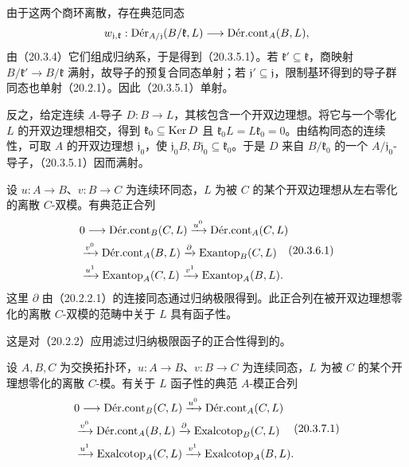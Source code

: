 由于这两个商环离散，存在典范同态
\[
 w_{\mathfrak j,\mathfrak k}:\Der_{A/\mathfrak j}(B/\mathfrak k,L)
 \longrightarrow\DerCont_A(B,L),
\]
由（20.3.4）它们组成归纳系，于是得到（20.3.5.1）。若 $\mathfrak k'\subseteq\mathfrak k$，商映射 $B/\mathfrak k'\to B/\mathfrak k$ 满射，故导子的预复合同态单射；若 $\mathfrak j'\subseteq\mathfrak j$，限制基环得到的导子群同态也单射（20.2.1）。因此（20.3.5.1）单射。

反之，给定连续 $A$-导子 $D:B\to L$，其核包含一个开双边理想。将它与一个零化 $L$ 的开双边理想相交，得到 $\mathfrak k_0\subseteq\Ker D$ 且 $\mathfrak k_0L=L\mathfrak k_0=0$。由结构同态的连续性，可取 $A$ 的开双边理想 $\mathfrak j_0$，使 $\mathfrak j_0B,B\mathfrak j_0\subseteq\mathfrak k_0$。于是 $D$ 来自 $B/\mathfrak k_0$ 的一个 $A/\mathfrak j_0$-导子，（20.3.5.1）因而满射。

设 $u:A\to B$、$v:B\to C$ 为连续环同态，$L$ 为被 $C$ 的某个开双边理想从左右零化的离散 $C$-双模。有典范正合列
\begin{equation}
\begin{aligned}
 &0\longrightarrow\DerCont_B(C,L)\xrightarrow{u^0}\DerCont_A(C,L)\\
 &\qquad\xrightarrow{v^0}\DerCont_A(B,L)\xrightarrow{\partial}\Exantop_B(C,L)\\
 &\qquad\xrightarrow{u^1}\Exantop_A(C,L)\xrightarrow{v^1}\Exantop_A(B,L).
\end{aligned}
\tag{20.3.6.1}
\end{equation}
这里 $\partial$ 由（20.2.2.1）的连接同态通过归纳极限得到。此正合列在被开双边理想零化的离散 $C$-双模的范畴中关于 $L$ 具有函子性。

这是对（20.2.2）应用滤过归纳极限函子的正合性得到的。

设 $A,B,C$ 为交换拓扑环，$u:A\to B$、$v:B\to C$ 为连续同态，$L$ 为被 $C$ 的某个开理想零化的离散 $C$-模。有关于 $L$ 函子性的典范 $A$-模正合列
\begin{equation}
\begin{aligned}
 &0\longrightarrow\DerCont_B(C,L)\xrightarrow{u^0}\DerCont_A(C,L)\\
 &\qquad\xrightarrow{v^0}\DerCont_A(B,L)\xrightarrow{\partial}\Exalcotop_B(C,L)\\
 &\qquad\xrightarrow{u^1}\Exalcotop_A(C,L)\xrightarrow{v^1}\Exalcotop_A(B,L).
\end{aligned}
\tag{20.3.7.1}
\end{equation}


